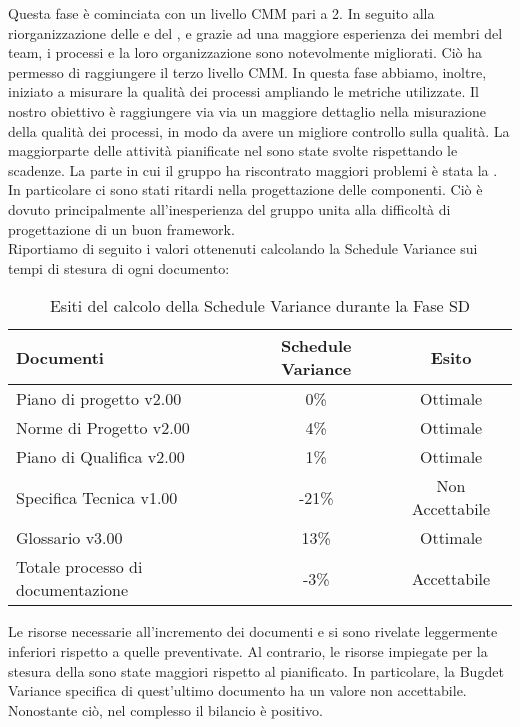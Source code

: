 			Questa fase è cominciata con un livello CMM pari a 2. In seguito alla riorganizzazione delle  e del , e grazie ad una maggiore esperienza dei membri del team, i processi e la loro organizzazione sono notevolmente migliorati. Ciò ha permesso di raggiungere il terzo livello CMM. In questa fase abbiamo, inoltre, iniziato a misurare la qualità dei processi ampliando le metriche utilizzate. Il nostro obiettivo è raggiungere via via un maggiore dettaglio nella misurazione della qualità dei processi, in modo da avere un migliore controllo sulla qualità.
			La maggiorparte delle attività pianificate nel  sono state svolte rispettando le scadenze. La parte in cui il gruppo ha riscontrato maggiori problemi è stata la . In particolare ci sono stati ritardi nella progettazione delle componenti. Ciò è dovuto principalmente all'inesperienza del gruppo unita alla difficoltà di progettazione di un buon framework.\\
			Riportiamo di seguito i valori ottenenuti calcolando la Schedule Variance sui tempi di stesura di ogni documento:
			\begin{table}[H]
					\centering
					\begin{tabu}{| l | c | c |}
							\hline
							Documenti 							& Schedule Variance	& Esito		\\ \hline \hline
							
							Piano di progetto v2.00				& 0\% 		& Ottimale  \\ \hline
							Norme di Progetto v2.00 			& 4\%		& Ottimale  \\ \hline
							Piano di Qualifica v2.00 			& 1\%		& Ottimale  \\ \hline
							Specifica Tecnica v1.00 			& -21\%		& Non Accettabile  \\ \hline
							Glossario v3.00					 	& 13\% 		& Ottimale  \\ \hline
							Totale processo di documentazione & -3\% & Accettabile \\ \hline
						\end{tabu}
					\caption{Esiti del calcolo della Schedule Variance durante la Fase SD}
				\end{table}
			Le risorse necessarie all'incremento dei documenti  e  si sono rivelate leggermente inferiori rispetto a quelle preventivate. Al contrario, le risorse impiegate per la stesura della  sono state maggiori rispetto al pianificato. In particolare, la Bugdet Variance specifica di quest'ultimo documento ha un valore non accettabile. Nonostante ciò, nel complesso il bilancio è positivo.\\
